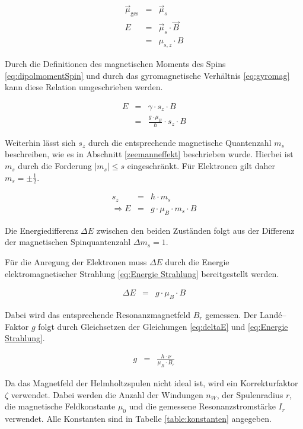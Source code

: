 \documentclass[12pt,a4paper]{scrartcl}
\numberwithin{equation}{section} %
\begin{document}
\begin{eqnarray}
	\vec{\mu}_\mathrm{ges} &=& \vec{\mu}_s \\
	E &=& \vec{\mu}_s \cdot \vec{B} \\
		&=& \mu_{s,z} \cdot B
\end{eqnarray}

\noindent
Durch die Definitionen des magnetischen Moments des Spins \eqref{eq:dipolmomentSpin} und durch das gyromagnetische Verhältnis \eqref{eq:gyromag} kann diese Relation umgeschrieben werden.

\begin{eqnarray}
	E &=& \gamma \cdot s_z \cdot B \\
		&=& \frac{g \cdot \mu_B}{\hbar} \cdot s_z \cdot B
\end{eqnarray}

\noindent
Weiterhin lässt sich $s_z$ durch die entsprechende magnetische Quantenzahl $m_s$ beschreiben, wie es in Abschnitt \ref{zeemanneffekt} beschrieben wurde. Hierbei ist $m_s$ durch die Forderung $|m_s|\le s$ eingeschränkt. Für Elektronen gilt daher $m_s=\pm\frac{1}{2}$.

\begin{eqnarray}
	s_z &=& \hbar \cdot m_s \\
	\Rightarrow E &=& g \cdot \mu_B \cdot m_s \cdot B
\end{eqnarray}

\noindent
Die Energiedifferenz $\Delta E$ zwischen den beiden Zuständen folgt aus der Differenz der magnetischen Spinquantenzahl $\Delta m_s = 1$.

Für die Anregung der Elektronen muss $\Delta E$ durch die Energie elektromagnetischer Strahlung \eqref{eq:Energie Strahlung} bereitgestellt werden.

\begin{eqnarray}
	\Delta E &=& g \cdot \mu_B \cdot B \label{eq:deltaE}
\end{eqnarray}

Dabei wird das entsprechende Resonanzmagnetfeld $B_r$ gemessen. Der Landé--Faktor $g$ folgt durch Gleichsetzen der Gleichungen \eqref{eq:deltaE} und \eqref{eq:Energie Strahlung}.

\begin{eqnarray}
	g &=& \frac{h \cdot \nu}{\mu_B \cdot B_r}
\end{eqnarray}

\noindent
Da das Magnetfeld der Helmholtzspulen nicht ideal ist, wird ein Korrekturfaktor $\zeta$ verwendet. Dabei werden die Anzahl der Windungen $n_W$, der Spulenradius $r$, die magnetische Feldkonstante $\mu_0$ und die gemessene Resonanzstromstärke $I_r$ verwendet. Alle Konstanten sind in Tabelle \ref{table:konstanten} angegeben.
\end{document}
